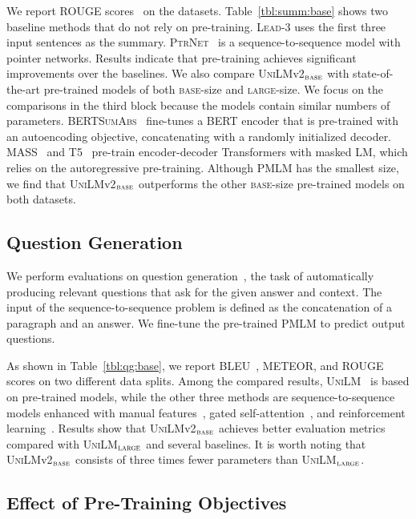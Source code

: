 \documentclass{article}
\newcommand\pmlm{\textsc{PMLM}}
\newcommand{\unilmvone}{\textsc{UniLM}}
\newcommand{\vonelarge}{\textsc{UniLM}$_{\textsc{large}}$}
\newcommand{\vtwobase}{\textsc{UniLM}v2$_{\textsc{base}}$}
\begin{document}
We report ROUGE scores~\cite{lin-2004-rouge} on the datasets.
Table~\ref{tbl:summ:base} shows two baseline methods that do not rely on pre-training.
\textsc{Lead}-3 uses the first three input sentences as the summary.
\textsc{PtrNet}~\cite{see-2017-get} is a sequence-to-sequence model with pointer networks.
Results indicate that pre-training achieves significant improvements over the baselines.
We also compare \vtwobase{} with state-of-the-art pre-trained models of both \textsc{base}-size and \textsc{large}-size.
We focus on the comparisons in the third block because the models contain similar numbers of parameters.
\textsc{BERTSumAbs}~\cite{bertsum} fine-tunes a BERT encoder that is pre-trained with an autoencoding objective, concatenating with a randomly initialized decoder.
MASS~\cite{mass} and T5~\cite{t5} pre-train encoder-decoder Transformers with masked LM, which relies on the autoregressive pre-training.
Although \pmlm{} has the smallest size, we find that \vtwobase{} outperforms the other \textsc{base}-size pre-trained models on both datasets.


\subsection{Question Generation}

We perform evaluations on question generation~\cite{du-qg-2018}, the task of automatically producing relevant questions that ask for the given answer and context.
The input of the sequence-to-sequence problem is defined as the concatenation of a paragraph and an answer.
We fine-tune the pre-trained \pmlm{} to predict output questions.

As shown in Table~\ref{tbl:qg:base}, we report BLEU~\cite{bleu}, METEOR\cite{meteor}, and ROUGE~\cite{lin-2004-rouge} scores on two different data splits.
Among the compared results, \unilmvone{}~\cite{unilm} is based on pre-trained models, while the other three methods are sequence-to-sequence models enhanced with manual features~\cite{du-qg-2018}, gated self-attention~\cite{zhao-qg-2018}, and reinforcement learning~\cite{zhang-qg-2019}.
Results show that \vtwobase{} achieves better evaluation metrics compared with \vonelarge{} and several baselines.
It is worth noting that \vtwobase{} consists of three times fewer parameters than \vonelarge{}.

\subsection{Effect of Pre-Training Objectives}
\label{sec:effect:obj}
\end{document}
